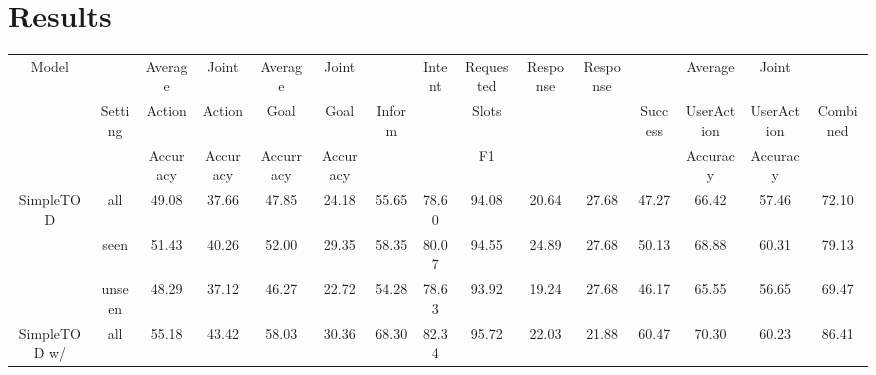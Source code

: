 
\section{Results}

\begin{table}
    \centering
    \begin{adjustbox}{max width=\textwidth}
        \begin{tabular}{|c|c|c|c|c|c|c|c|c|c|c|c|c|c|c|}
            \hline
            \multirow{3}{*}{Model}     &         & Average  & Joint    & Average        & Joint          &                & \multirow{2}{*}{Intent}   & Requested & \multirow{2}{*}{Response} & \multirow{2}{*}{Response} &         & Average    & Joint      &          \\
                                       & Setting & Action   & Action   & Goal           & Goal           & Inform         & \multirow{2}{*}{Accuracy} & Slots     & \multirow{2}{*}{GLEU}     & \multirow{2}{*}{ROUGE-2}  & Success & UserAction & UserAction & Combined \\
                                       &         & Accuracy & Accuracy & Accurracy      & Accuracy       &                &                           & F1        &                           &                           &         & Accuracy   & Accuracy   &          \\ \hline
            \multirow{3}{*}{SimpleTOD} & all     & 49.08    & 37.66    & 47.85          & 24.18          & 55.65          & 78.60                     & 94.08     & 20.64                     & 27.68                     & 47.27   & 66.42      & 57.46      & 72.10    \\
                                       & seen    & 51.43    & 40.26    & 52.00          & 29.35          & 58.35          & 80.07                     & 94.55     & 24.89                     & 27.68                     & 50.13   & 68.88      & 60.31      & 79.13    \\
                                       & unseen  & 48.29    & 37.12    & 46.27          & 22.72          & 54.28          & 78.63                     & 93.92     & 19.24                     & 27.68                     & 46.17   & 65.55      & 56.65      & 69.47    \\ \hline
            {SimpleTOD w/}             & all     & 55.18    & 43.42    & 58.03          & 30.36          & 68.30          & 82.34                     & 95.72     & 22.03                     & 21.88                     & 60.47   & 70.30      & 60.23      & 86.41    \\

\end{tabular}
\end{adjustbox}
\end{table}

